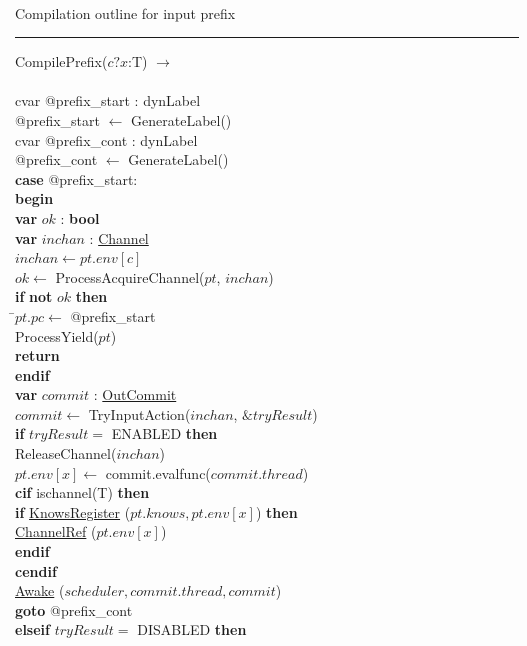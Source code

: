 \documentclass[a4paper,11pt]{article}
\newenvironment{program}{
  \begin{sffamily}
  \begin{scriptsize}
  \begin{tabbing}}
 {\end{tabbing}
  \end{scriptsize}
  \end{sffamily}}
\newcommand{\kw}[1]{\textsf{\textbf{#1}}}
\newcommand{\pindent}{\hspace{2em}\=}
\newcommand{\compiletime}[1]{\textcolor{compilecolor}{#1}}
\newcommand{\synchro}[1]{\textcolor{synchrocolor}{#1}}
\newcommand{\algotitle}[1]{\noindent\\ \noindent#1\par\nobreak\vspace{3pt}\hrule\vspace{6pt}}
\newcommand{\algosection}[1]{
  \phantomsection
  \algotitle{#1}
}
\newcommand{\myref}[1]{
  \hyperref[#1]{#1}
}
\begin{document}
\algosection{Compilation outline for input prefix}
\begin{program}
  \compiletime{CompilePrefix($c?x$:T) $\rightarrow$} \\ \\
  \compiletime{cvar @prefix\_start : dynLabel} \\
  \compiletime{@prefix\_start $\leftarrow$ GenerateLabel()} \\
  \compiletime{cvar @prefix\_cont : dynLabel} \\
  \compiletime{@prefix\_cont $\leftarrow$ GenerateLabel()} \\
  \kw{case} @prefix\_start: \\
  \kw{begin} \\
   \pindent \kw{var} $ok$ : \kw{bool} \\
   \> \kw{var} $inchan$ : \myref{Channel} \\
   \> $inchan \leftarrow pt.env[c]$ \\
   \> $ok \leftarrow $ ProcessAcquireChannel($pt$, $inchan$) \\
  \> \kw{if} \kw{not} $ok$  \kw{then} \\
  \> \pindent $pt.pc \leftarrow $ @prefix\_start \\
  \>  \> ProcessYield($pt$) \\
  \>  \> \kw{return}\\
  \>  \kw{endif} \\
  \pindent\kw{var} $commit$ : \myref{OutCommit} \\
  \> $commit \leftarrow$ TryInputAction($inchan$, $\& tryResult$) \\
  \>\kw{if} $tryResult =$ ENABLED \kw{then} \\
  \>\pindent \synchro{ReleaseChannel($inchan$)} \\
  \>\> $pt.env[x] \leftarrow$ commit.evalfunc($commit.thread$) \\
  \>\>\compiletime{\kw{cif} ischannel(T) \kw{then}} \\
  \>\>\pindent\kw{if} \myref{KnowsRegister}($pt.knows, pt.env[x]$) \kw{then} \\
  \>\>\>\pindent \myref{ChannelRef}($pt.env[x]$) \\
  \>\>\>\kw{endif} \\
  \>\>\compiletime{\kw{cendif}} \\
  \>\>\myref{Awake}($scheduler, commit.thread, commit$) \\
  \>\>\kw{goto} @prefix\_cont \\
  \>\kw{elseif} $tryResult =$ DISABLED \kw{then} \\

\end{program}
\end{document}
